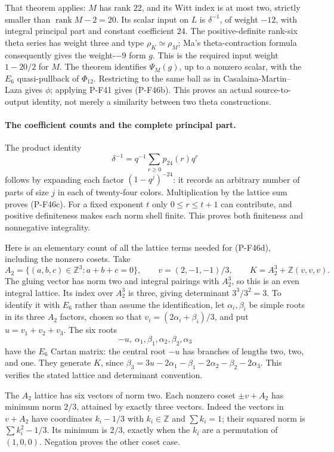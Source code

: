 \documentclass[11pt,a4paper]{article}
\begin{document}
That theorem applies: $M$ has rank $22$, and its
Witt index is at most two, strictly smaller than
$\operatorname{rank}M-2=20$. Its scalar input on
$L$ is $\delta^{-1}$, of weight $-12$, with
integral principal part and constant coefficient
$24$. The positive-definite rank-six theta series
has weight three and type $\rho_K\simeq\rho_M$;
Ma's theta-contraction formula consequently gives
the weight-$-9$ form $g$. This is the required
input weight $1-20/2$ for $M$.
The theorem identifies $\Psi_M(g)$, up to a
nonzero scalar, with the $E_6$ quasi-pullback of
$\Phi_{12}$. Restricting to the same ball as in
Casalaina-Martin--Laza gives $\phi$; applying
P-F41 gives (P-F46b). This proves an actual
source-to-output identity, not merely a similarity
between two theta constructions.

\paragraph{The coefficient counts and the complete principal part.}
The product identity
\[
             \delta^{-1}=q^{-1}
                    \sum_{r\ge0}p_{24}(r)q^r
\]
follows by expanding each factor $(1-q^j)^{-24}$:
it records an arbitrary number of parts of size $j$
in each of twenty-four colors. Multiplication by
the lattice sum proves (P-F46c). For a fixed exponent
$t$ only $0\le r\le t+1$ can contribute, and
positive definiteness makes each norm shell finite.
This proves both finiteness and nonnegative integrality.

Here is an elementary count of all the lattice terms
needed for (P-F46d), including the nonzero cosets.
Take
\[
 A_2=\{(a,b,c)\in\mathbb Z^3:a+b+c=0\},
 \qquad v=(2,-1,-1)/3,
 \qquad
 K=A_2^3+\mathbb Z(v,v,v).
 \tag{P-F46f}
\]
The gluing vector has norm two and integral pairings
with $A_2^3$, so this is an even integral lattice.
Its index over $A_2^3$ is three, giving determinant
$3^3/3^2=3$. To identify it with $E_6$ rather than
assume the identification, let $\alpha_i,\beta_i$
be simple roots in its three $A_2$ factors, chosen
so that $v_i=(2\alpha_i+\beta_i)/3$, and put
$u=v_1+v_2+v_3$.
The six roots
\[
             -u,\ \alpha_1,\beta_1,\alpha_2,\beta_2,\alpha_3
\]
have the $E_6$ Cartan matrix: the central root $-u$
has branches of lengths two, two, and one.
They generate $K$, since
$\beta_3=3u-2\alpha_1-\beta_1-2\alpha_2-\beta_2-2\alpha_3$.
This verifies the stated lattice and determinant convention.

The $A_2$ lattice has six vectors of norm two.
Each nonzero coset $\pm v+A_2$ has minimum norm
$2/3$, attained by exactly three vectors.
Indeed the vectors in $v+A_2$ have coordinates
$k_i-1/3$ with $k_i\in\mathbb Z$ and $\sum k_i=1$;
their squared norm is $\sum k_i^2-1/3$.
Its minimum is $2/3$, exactly when the $k_i$ are
a permutation of $(1,0,0)$. Negation proves the
other coset case.
\end{document}
